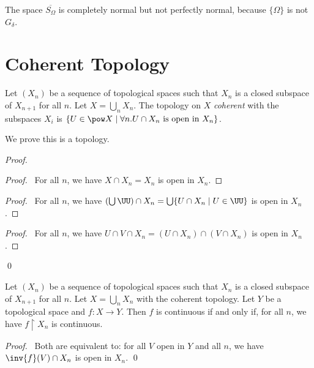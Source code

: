 \begin{example}
    The space $\overline{S_\Omega}$ is completely normal but not perfectly normal,
    because $\{\Omega\}$ is not $G_\delta$.
\end{example}

\section{Coherent Topology}

\begin{definition}
    Let $(X_n)$ be a sequence of topological spaces such that $X_n$ is a closed subspace of $X_{n+1}$ for all $n$.
    Let $X = \bigcup_n X_n$. The topology on $X$ \emph{coherent} with the subspaces $X_i$ is $\{ U \in \pow X \mid \forall n.
    U \cap X_n \text{ is open in } X_n \}$.

    We prove this is a topology.
\end{definition}

\begin{proof}
    \pf
    \begin{proof}
        \pf\ For all $n$, we have $X \cap X_n = X_n$ is open in $X_n$.
    \end{proof}
    \begin{proof}
        \pf\ For all $n$, we have $(\bigcup \UU) \cap X_n = \bigcup \{ U \cap X_n \mid U \in \UU \}$ is open in $X_n$.
    \end{proof}
    \begin{proof}
        \pf\ For all $n$, we have $U \cap V \cap X_n = (U \cap X_n) \cap (V \cap X_n)$ is open in $X_n$.
    \end{proof}
    \qed
\end{proof}

\begin{proposition}
    \label{proposition:coherent_continuous}
    Let $(X_n)$ be a sequence of topological spaces such that $X_n$ is a closed subspace of $X_{n+1}$ for all $n$.
    Let $X = \bigcup_n X_n$ with the coherent topology. Let $Y$ be a topological space and $f : X \rightarrow Y$.
    Then $f$ is continuous if and only if, for all $n$, we have $f \restriction X_n$ is continuous.
\end{proposition}

\begin{proof}
    \pf\ Both are equivalent to: for all $V$ open in $Y$ and all $n$, we have $\inv{f}(V) \cap X_n$ is open in $X_n$. \qed
\end{proof}

